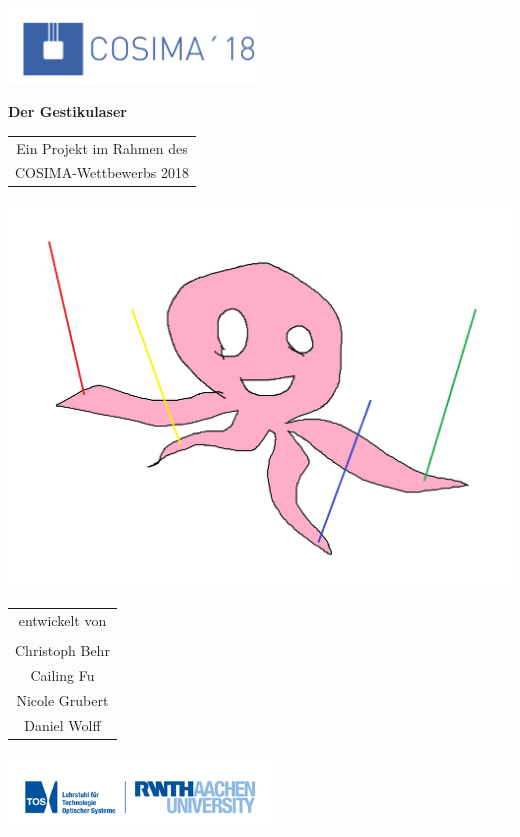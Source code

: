 \documentclass[a4paper,12pt,notumble]{leaflet}
\begin{document}
\begin{center}

\includegraphics[height=2cm]{../Logos/Cosima18.png}

\bfseries\Huge
Der Gestikulaser

\vfill

\normalsize

\begin{tabular}{c}
	Ein Projekt im Rahmen des \\
	COSIMA-Wettbewerbs 2018
\end{tabular}

\vfill

\includegraphics[scale=0.25]{../Logos/gestikulaser.png}

\vfill

\begin{tabular}{c}
	entwickelt von \\ \\
	Christoph Behr \\
	Cailing Fu \\
	Nicole Grubert \\
	Daniel Wolff
\end{tabular}

\vfill

\includegraphics[height=2cm]{../Logos/TOS.png}

\end{center}
\end{document}

